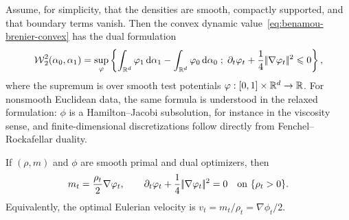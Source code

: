 \begin{prop}\label{prop-benamou-brenier-dual}
	Assume, for simplicity, that the densities are smooth, compactly supported, and that boundary terms vanish. Then the convex dynamic value~\eqref{eq:benamou-brenier-convex} has the dual formulation
	\begin{equation}\label{eq:benamou-brenier-dual}
		\operatorname{\mathcal{W}}_2^2(\alpha_0,\alpha_1)
		=
		\sup_{\varphi}
		\left\{ 
		\int_{\mathbb{R}^d}\varphi_1\,\mathrm{d}\alpha_1
		-
		\int_{\mathbb{R}^d}\varphi_0\,\mathrm{d}\alpha_0
		 \;;\; 
		\partial_t\varphi_t+\frac14|\!| \nabla\varphi_t |\!|^2\leqslant 0
		 \right\},
	\end{equation}
	where the supremum is over smooth test potentials $\varphi:[0,1]\times\mathbb{R}^d\to\mathbb{R}$. For nonsmooth Euclidean data, the same formula is understood in the relaxed formulation: $\phi$ is a Hamilton--Jacobi subsolution, for instance in the viscosity sense, and finite-dimensional discretizations follow directly from Fenchel--Rockafellar duality.

	If $(\rho,m)$ and $\phi$ are smooth primal and dual optimizers, then
	\begin{equation}\label{eq:bb-primal-dual-relation}
		m_t=\frac{\rho_t}{2}\nabla\varphi_t,
		\qquad
		\partial_t\varphi_t+\frac14|\!| \nabla\varphi_t |\!|^2=0
		\quad\text{on }\{\rho_t>0\}.
	\end{equation}
	Equivalently, the optimal Eulerian velocity is $v_t=m_t/\rho_t=\nabla\phi_t/2$.
\end{prop}

